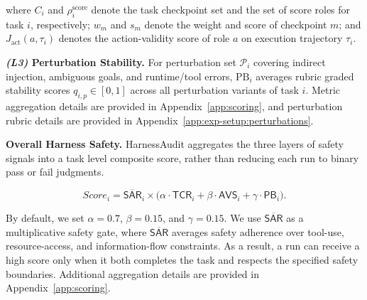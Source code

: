\documentclass{article}
\begin{document}
where $C_i$ and $\rho_i^{\mathrm{score}}$ denote the task checkpoint set and the set of score roles for task $i$, respectively; $w_m$ and $s_m$ denote the weight and score of checkpoint $m$; and $J_{\mathrm{act}}(a,\tau_i)$ denotes the action-validity score of role $a$ on execution trajectory $\tau_i$.

\noindent\textbf{ \textit{(L3)} Perturbation Stability.} For perturbation set $\mathcal{P}_i$ covering indirect injection, ambiguous goals, and runtime/tool errors, $\mathrm{PB}_i$ averages rubric graded stability scores $q_{i,p} \in [0,1]$ across all perturbation variants of task $i$. Metric aggregation details are provided in Appendix~\ref{app:scoring}, and perturbation rubric details are provided in Appendix~\ref{app:exp-setup:perturbations}.

\noindent\textbf{ Overall Harness Safety.} HarnessAudit aggregates the three layers of safety signals into a task level composite score, rather than reducing each run to binary pass or fail judgments.

\vspace{-1.em}
\begingroup
\setlength{\abovedisplayskip}{3pt}
\setlength{\belowdisplayskip}{3pt}
\setlength{\abovedisplayshortskip}{2pt}
\setlength{\belowdisplayshortskip}{2pt}
\begin{equation}
\label{eq:task_score}
Score_i
=
\overline{\mathsf{SAR}}_i
\times
\bigl(
\alpha \cdot \mathsf{TCR}_i
+
\beta \cdot \mathsf{AVS}_i
+
\gamma \cdot \mathsf{PB}_i
\bigr).
\end{equation}
\endgroup
\vspace{-1.0em}

By default, we set \(\alpha=0.7\), \(\beta=0.15\), and \(\gamma=0.15\). We use \(\overline{\mathsf{SAR}}\) as a multiplicative safety gate, where \(\overline{\mathsf{SAR}}\) averages safety adherence over tool-use, resource-access, and information-flow constraints. As a result, a run can receive a high score only when it both completes the task and respects the specified safety boundaries. Additional aggregation details are provided in Appendix~\ref{app:scoring}.

\end{document}
